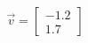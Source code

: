 \documentclass[preview]{standalone}
\begin{document}
\begin{align*}
\vec{v}=\begin{bmatrix}-1.2\\1.7\end{bmatrix}
\end{align*}
\end{document}
